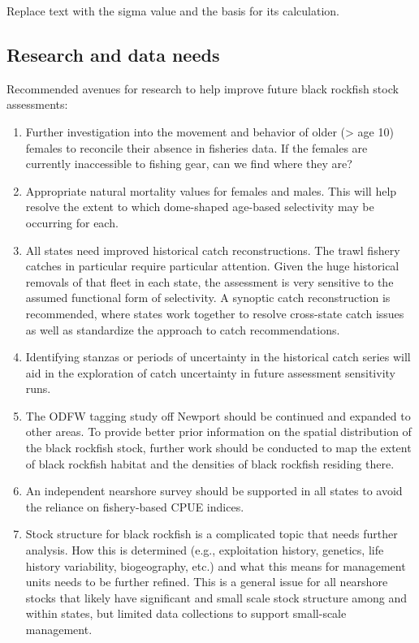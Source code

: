 \documentclass[11pt,
  english,
  letterpaper,
]{article}
\providecommand{\tightlist}{%
  \setlength{\itemsep}{0pt}\setlength{\parskip}{0pt}}
\providecommand{\tightlist}{%
  \setlength{\itemsep}{0pt}\setlength{\parskip}{0pt}}
\begin{document}
Replace text with the sigma value and the basis for its calculation.

\hypertarget{research-and-data-needs}{%
\subsection*{Research and data needs}\label{research-and-data-needs}}

Recommended avenues for research to help improve future black rockfish stock assessments:

\begin{enumerate}
\def\labelenumi{\arabic{enumi}.}
\tightlist
\item
  Further investigation into the movement and behavior of older (\textgreater{} age 10) females to reconcile their absence in fisheries data. If the females are currently inaccessible to fishing gear, can we find where they are?
\item
  Appropriate natural mortality values for females and males. This will help resolve the extent to which dome-shaped age-based selectivity may be occurring for each.
\item
  All states need improved historical catch reconstructions. The trawl fishery catches in particular require particular attention. Given the huge historical removals of that fleet in each state, the assessment is very sensitive to the assumed functional form of selectivity. A synoptic catch reconstruction is recommended, where states work together to resolve cross-state catch issues as well as standardize the approach to catch recommendations.
\item
  Identifying stanzas or periods of uncertainty in the historical catch series will aid in the exploration of catch uncertainty in future assessment sensitivity runs.
\item
  The ODFW tagging study off Newport should be continued and expanded to other areas. To provide better prior information on the spatial distribution of the black rockfish stock, further work should be conducted to map the extent of black rockfish habitat and the densities of black rockfish residing there.
\item
  An independent nearshore survey should be supported in all states to avoid the reliance on fishery-based CPUE indices.
\item
  Stock structure for black rockfish is a complicated topic that needs further analysis. How this is determined (e.g., exploitation history, genetics, life history variability, biogeography, etc.) and what this means for management units needs to be further refined. This is a general issue for all nearshore stocks that likely have significant and small scale stock structure among and within states, but limited data collections to support small-scale management.
\end{enumerate}
\end{document}
